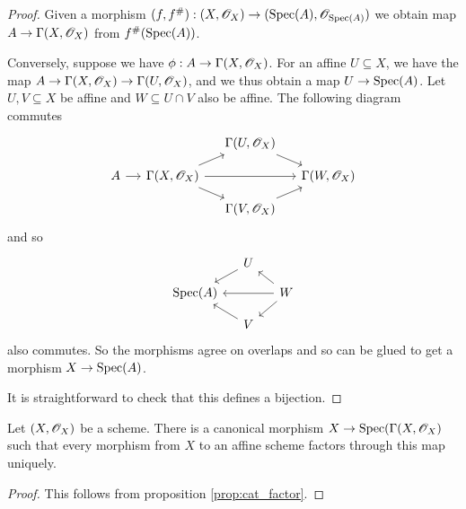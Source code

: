 \documentclass{memoir}
\begin{document}
\begin{proof}
    Given a morphism $(f,f^\#):(X,\mathscr{O}_X) \to (\operatorname{Spec}(A),\mathscr{O}_{\operatorname{Spec}(A)})$ we obtain map $A\to \Gamma(X,\mathscr{O}_X)$ from $f^\#(\operatorname{Spec}(A))$.

    Conversely, suppose we have $\phi:A\to \Gamma(X,\mathscr{O}_X)$.
    For an affine $U\subseteq X$, we have the map $A\to \Gamma(X,\mathscr{O}_X) \to \Gamma(U,\mathscr{O}_X)$, and we thus obtain a map $U\to \operatorname{Spec}(A)$.
    Let $U,V\subseteq X$ be affine and $W\subseteq U\cap V$ also be affine.
    The following diagram commutes
    \begin{equation}
        \begin{tikzcd}[column sep=small,row sep=small]
            & & \Gamma(U,\shf{O}_X) \arrow[dr] & \\
            A \arrow[r] & \Gamma(X,\shf{O}_X) \arrow[ur] \arrow[dr] \arrow[rr] & & \Gamma(W,\shf{O}_X) \\
                        & & \Gamma(V,\shf{O}_X) \arrow[ur] &
        \end{tikzcd}
    \end{equation}
    and so 
    \begin{equation}
        \begin{tikzcd}[column sep=small,row sep=small]
                     & U \arrow[dl] & \\
            \Spec(A) & & W \arrow[dl] \arrow[ul] \arrow[ll] \\
                     & V \arrow[ul] &
        \end{tikzcd}
    \end{equation}
    also commutes.
    So the morphisms agree on overlaps and so can be glued to get a morphism $X\to \operatorname{Spec}(A)$.

    It is straightforward to check that this defines a bijection.
\end{proof}
\begin{corollary}
    Let $(X,\mathscr{O}_X)$ be a scheme. 
    There is a canonical morphism $X\to \operatorname{Spec}(\Gamma(X,\mathscr{O}_X)$ such that every morphism from $X$ to an affine scheme factors through this map uniquely.
\end{corollary}
\begin{proof}
    This follows from proposition \ref{prop:cat_factor}.
\end{proof}
\end{document}
